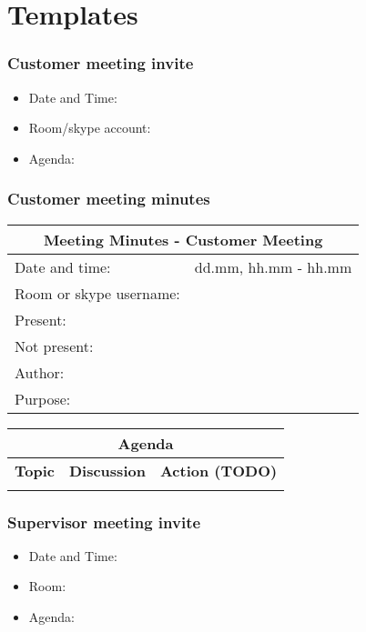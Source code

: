 \section{Templates}

\subsubsection{Customer meeting invite}

\begin{itemize}
	\item Date and Time:
	\item Room/skype account:
	\item Agenda:
\end{itemize}

\subsubsection{Customer meeting minutes}
\begin{tabular}{| p{4cm} | p{10cm} |}
	\hline
	\multicolumn{2}{|c|}{\Large \bf Meeting Minutes - Customer Meeting} \\ \hline
	Date and time: & dd.mm,  hh.mm - hh.mm \\ \hline
	Room or skype username: &  \\ \hline
	Present: &  \\ \hline
	Not present: &  \\ \hline
	Author: &  \\ \hline
	Purpose: &  \\ \hline
\end{tabular}

\begin{tabular}{| p{4cm} | p{6cm} | p{4cm} |}
	\hline
	\multicolumn{3}{|c|}{\Large \bf Agenda} \\ \hline
	{\bf Topic} & {\bf Discussion} & {\bf Action (TODO)} \\ \hline
	 & & \\ \hline


\end{tabular}

\subsubsection{Supervisor meeting invite}

\begin{itemize}
	\item Date and Time:
	\item Room:
	\item Agenda:
\end{itemize}

